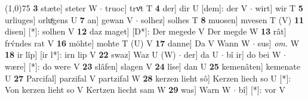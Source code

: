 \documentclass[8pt,a4paper,notitlepage]{article}
\begin{document}
\begin{table}[ht]
\begin{minipage}[t]{0.5\linewidth}
\line(1,0){75} \newline
\textbf{3} stæte] steter W  $\cdot$ truoc] trvͦt T \textbf{4} der] dir U [dem]: der V  $\cdot$ wirt] wir T \textbf{5} urliuges] orluͦgens U \textbf{7} an] gewan V  $\cdot$ solhez] solhes T \textbf{8} muosen] mvesen T (V) \textbf{11} disen] [*]: solhen V \textbf{12} daz maget] [D*]: Der megede V Der megde W \textbf{13} rât] frv́ndes rat V \textbf{16} möhte] mohte T (U) V \textbf{17} danne] Da V Wann W  $\cdot$ sus] \textit{om.} W \textbf{18} ir lîp] [ir l*]: irn lip V \textbf{22} swaz] Waz U (W)  $\cdot$ der] da U  $\cdot$ bî ir] do bei W  $\cdot$ wære] [*]: do were V \textbf{23} slâfen] slagen V \textbf{24} lîse] dan U \textbf{25} kemenâten] kemenate U \textbf{27} Parcifal] parzifal V partzifal W \textbf{28} kerzen lieht sô] Kerzen liech so U [*]: Von kerzen lieht so V Kertzen liecht sam W \textbf{29} was] Warn W  $\cdot$ bî] [*]: vor V \newline
\end{minipage}
\end{table}
\end{document}
